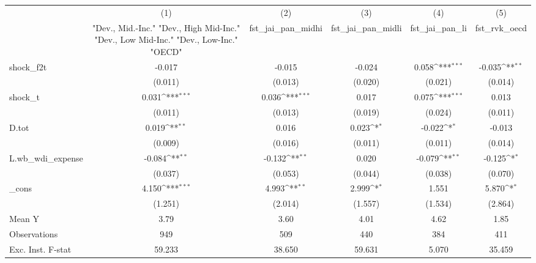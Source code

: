 {
\def\sym#1{\ifmmode^{#1}\else\(^{#1}\)\fi}
\begin{tabular}{l*{5}{c}}
\toprule
            &\multicolumn{1}{c}{(1)}&\multicolumn{1}{c}{(2)}&\multicolumn{1}{c}{(3)}&\multicolumn{1}{c}{(4)}&\multicolumn{1}{c}{(5)}\\
            &\multicolumn{1}{c}{ "Dev., Mid.-Inc." "Dev., High Mid-Inc." "Dev., Low Mid-Inc." "Dev., Low-Inc." "OECD" }&\multicolumn{1}{c}{fst\_jai\_pan\_midhi}&\multicolumn{1}{c}{fst\_jai\_pan\_midli}&\multicolumn{1}{c}{fst\_jai\_pan\_li}&\multicolumn{1}{c}{fst\_rvk\_oecd}\\
\midrule
shock\_f2t   &      -0.017         &      -0.015         &      -0.024         &       0.058\sym{***}&      -0.035\sym{**} \\
            &     (0.011)         &     (0.013)         &     (0.020)         &     (0.021)         &     (0.014)         \\
\addlinespace
shock\_t     &       0.031\sym{***}&       0.036\sym{***}&       0.017         &       0.075\sym{***}&       0.013         \\
            &     (0.011)         &     (0.013)         &     (0.019)         &     (0.024)         &     (0.011)         \\
\addlinespace
D.tot       &       0.019\sym{**} &       0.016         &       0.023\sym{*}  &      -0.022\sym{*}  &      -0.013         \\
            &     (0.009)         &     (0.016)         &     (0.011)         &     (0.011)         &     (0.014)         \\
\addlinespace
L.wb\_wdi\_expense&      -0.084\sym{**} &      -0.132\sym{**} &       0.020         &      -0.079\sym{**} &      -0.125\sym{*}  \\
            &     (0.037)         &     (0.053)         &     (0.044)         &     (0.038)         &     (0.070)         \\
\addlinespace
\_cons      &       4.150\sym{***}&       4.993\sym{**} &       2.999\sym{*}  &       1.551         &       5.870\sym{*}  \\
            &     (1.251)         &     (2.014)         &     (1.557)         &     (1.534)         &     (2.864)         \\
\midrule
Mean Y      &        3.79         &        3.60         &        4.01         &        4.62         &        1.85         \\
Observations&         949         &         509         &         440         &         384         &         411         \\
Exc. Inst. F-stat&      59.233         &      38.650         &      59.631         &       5.070         &      35.459         \\
\bottomrule
\end{tabular}
}
